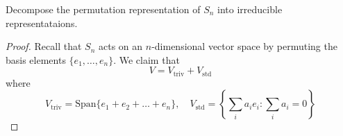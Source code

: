 \begin{prob}
    Decompose the permutation representation of $S_n$ into irreducible representataions.
\end{prob}
\begin{proof}
    Recall that $S_n$ acts on an $n$-dimensional vector space by permuting the basis elements $\{e_1,\dots, e_n\}$.
    We claim that 
    \begin{equation*}
        V=V_{\text{triv}}+V_{\text{std}}
    \end{equation*}
    where 
    \begin{equation*}
        V_{\text{triv}}=\text{Span}\{e_1+e_2+\dots+e_n\}, \quad V_{\text{std}}=\left\{\sum_ia_ie_i: \sum_ia_i=0\right\}
    \end{equation*}
\end{proof}

